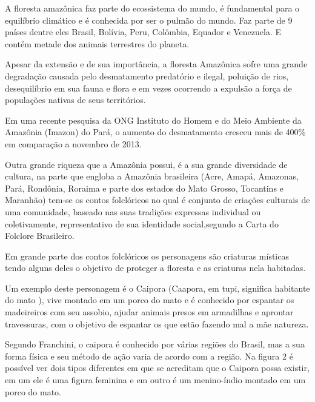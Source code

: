 A floresta amazônica faz parte do ecossistema do mundo, é fundamental para o equilíbrio climático e é conhecida por ser o pulmão do mundo. Faz parte de 9 países dentre eles Brasil, Bolívia, Peru, Colômbia, Equador e Venezuela. E contém metade dos animais terrestres do planeta.

Apesar da extensão e de sua importância, a floresta Amazônica sofre uma grande degradação causada pelo desmatamento predatório e ilegal, poluição de rios, desequilíbrio em sua fauna e flora e em vezes ocorrendo a expulsão a força de populações nativas de seus territórios.

Em uma recente pesquisa da ONG Instituto do Homem e do Meio Ambiente da Amazônia (Imazon) do Pará, o aumento do desmatamento cresceu mais de 400\% em comparação a novembro de 2013. \cite{des}

Outra grande riqueza que a Amazônia possui, é a sua grande diversidade de cultura, na parte que engloba a Amazônia brasileira (Acre, Amapá, Amazonas, Pará, Rondônia, Roraima e parte dos estados do Mato Grosso, Tocantins e Maranhão) tem-se os contos folclóricos no qual é conjunto de criações culturais de uma comunidade, baseado nas suas tradições expressas individual ou coletivamente, representativo de sua identidade social,segundo a Carta do Folclore Brasileiro.\cite{fc}

Em grande parte dos contos folclóricos os personagens são criaturas místicas tendo alguns deles o objetivo de proteger a floresta e as criaturas nela habitadas.


Um exemplo deste personagem é o Caipora (Caapora, em tupi, significa habitante do mato \cite{sig}), vive montado em um porco do mato e é conhecido por espantar os madeireiros com seu assobio, ajudar animais presos em armadilhas e aprontar travessuras, com o objetivo de espantar os que estão fazendo mal a mãe natureza. 

Segundo Franchini, o caipora é conhecido por várias regiões do Brasil, mas a sua forma física e seu método de ação varia de acordo com a região.
Na figura 2 é possível ver dois tipos diferentes em que se acreditam que o Caipora possa existir, em um ele é uma figura feminina e em outro é um menino-índio montado em um porco do mato. \cite{100}

\begin{figure}[h!]
		\centering
	\end{figure}